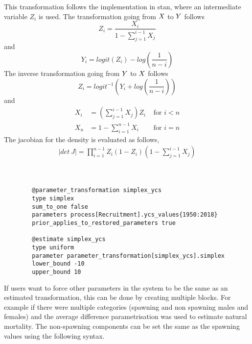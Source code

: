 \begin{enumerate}
This transformation follows the implementation in stan, where an intermediate variable \(Z_i\) is used. The transformation going from $\boldmath{X}$ to $\boldmath{Y}$ follows\\
\[
Z_i = \frac{X_i}{1 - \sum_{j = 1}^{i - 1}X_j}
\]
and 
\[
Y_i = logit(Z_i) - log\left(\frac{1}{n -i}\right)
\]
The inverse transformation going from $\boldmath{Y}$ to $\boldmath{X}$ follows
\[
Z_i = logit^{-1}\left(Y_i +  log\left(\frac{1}{n -i}\right)\right)
\]
and
\begin{align*}
	X_i &= \left( \sum_{j = 1}^{i - 1}X_j\right)Z_i & \text{ for } i < n\\
	X_n &= 1 - \sum_{i = 1}^{n - 1} X_i & \text{ for } i = n
\end{align*}
The jacobian for the density is evaluated as follows,
\begin{align*}
|det \ J| = \prod_{i = 1}^{n - 1} Z_i \left(1 - Z_i\right) \left(1 - \sum_{j = 1}^{i - 1}X_j\right)
\end{align*}
\\
\\
\label{sec:Transformation-Simplex}
{\small{\begin{verbatim}
		@parameter_transformation simplex_ycs
		type simplex
		sum_to_one false
		parameters process[Recruitment].ycs_values{1950:2018}
		prior_applies_to_restored_parameters true
		
		@estimate simplex_ycs
		type uniform
		parameter parameter_transformation[simplex_ycs].simplex
		lower_bound -10
		upper_bound 10

		\end{verbatim}}}	
\end{enumerate}


If users want to force other parameters in the system to be the same as an estimated transformation, this can be done by creating multiple  blocks. For example if there were multiple categories (spawning and non spawning males and females) and the average difference parametrisation was used to estimate natural mortality. The non-spawning components can be set the same as the spawning values using the following syntax.

